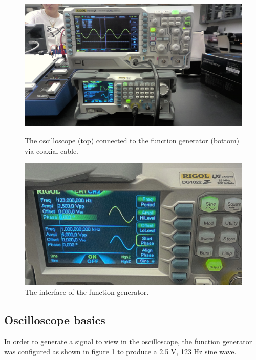 \documentclass{article}
\begin{document}
    \begin{figure}[h]
        \begin{minipage}{\textwidth/2}
            \includegraphics[width=\linewidth]{WIN_20240927_13_48_12_Pro.jpg}
            \caption{The oscilloscope (top) connected to the function generator (bottom) via coaxial cable.}
            \label{oscnfunc}
        \end{minipage}
        \begin{minipage}{\textwidth/2}
            \includegraphics[width=\linewidth]{WIN_20240927_13_51_59_Pro.jpg}
            \caption{The interface of the function generator.}
            \label{funcgen}
        \end{minipage}
    \end{figure}

    \subsection{Oscilloscope basics}
        In order to generate a signal to view in the oscilloscope, the function generator was configured as shown in figure \ref{funcgen} to produce a 2.5 V, 123 Hz sine wave.
\end{document}
